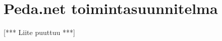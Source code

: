 \chapter{Peda.net toimintasuunnitelma}
\label{peda.net-toimintasuunnitelma}

[*** Liite puuttuu ***]
